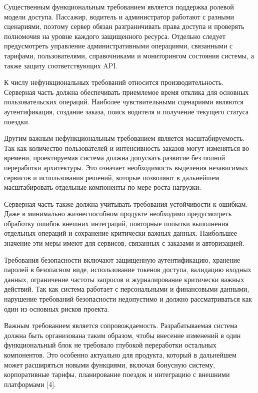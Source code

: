 {\par \redline Существенным функциональным требованием является поддержка ролевой модели доступа. Пассажир, водитель и администратор работают с разными сценариями, поэтому сервер обязан разграничивать права доступа и проверять полномочия на уровне каждого защищенного ресурса. Отдельно следует предусмотреть управление административными операциями, связанными с тарифами, пользователями, справочниками и мониторингом состояния системы, а также защиту соответствующих API.

\par \redline К числу нефункциональных требований относится производительность. Серверная часть должна обеспечивать приемлемое время отклика для основных пользовательских операций. Наиболее чувствительными сценариями являются аутентификация, создание заказа, поиск водителя и получение текущего статуса поездки.

\par \redline Другим важным нефункциональным требованием является масштабируемость. Так как количество пользователей и интенсивность заказов могут изменяться во времени, проектируемая система должна допускать развитие без полной переработки архитектуры. Это означает необходимость выделения независимых сервисов и использования решений, которые позволяют в дальнейшем масштабировать отдельные компоненты по мере роста нагрузки.

\par \redline Серверная часть также должна учитывать требования устойчивости к ошибкам. Даже в минимально жизнеспособном продукте необходимо предусмотреть обработку ошибок внешних интеграций, повторные попытки выполнения отдельных операций и сохранение критически важных данных. Наибольшее значение эти меры имеют для сервисов, связанных с заказами и авторизацией.

\par \redline Требования безопасности включают защищенную аутентификацию, хранение паролей в безопасном виде, использование токенов доступа, валидацию входных данных, ограничение частоты запросов и журналирование критически важных действий. Так как система работает с персональными и финансовыми данными, нарушение требований безопасности недопустимо и должно рассматриваться как один из основных рисков проекта.

\par \redline Важным требованием является сопровождаемость. Разрабатываемая система должна быть организована таким образом, чтобы внесение изменений в один функциональный блок не требовало глубокой переработки остальных компонентов. Это особенно актуально для продукта, который в дальнейшем может расширяться новыми функциями, включая бонусную систему, корпоративные тарифы, планирование поездок и интеграцию с внешними платформами [4].

}

